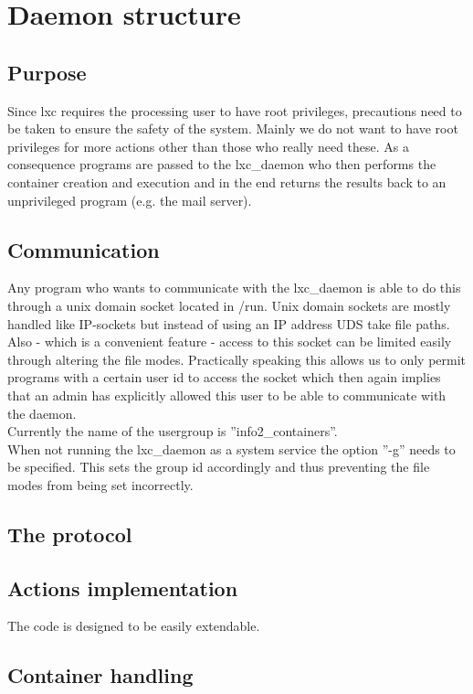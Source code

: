 \chapter{Daemon structure}

\section{Purpose}

Since lxc requires the processing user to have root privileges, precautions need to be taken to ensure
the safety of the system. Mainly we do not want to have root privileges for more actions other than those who really
need these. As a consequence programs are passed to the lxc\_daemon who then performs the container creation
and execution and in the end returns the results back to an unprivileged program (e.g. the mail server).

\section{Communication}

Any program who wants to communicate with the lxc\_daemon is able to do this through a unix domain socket located
in /run. Unix domain sockets are mostly handled like IP-sockets but instead of using an IP address UDS take file paths.
Also - which is a convenient feature - access to this socket can be limited easily through altering the file modes.
Practically speaking this allows us to only permit programs with a certain user id to access the socket which then again
implies that an admin has explicitly allowed this user to be able to communicate with the daemon.\\
Currently the name of the usergroup is ''info2\_containers''.\\
When not running the lxc\_daemon as a system service the option ''-g'' needs to be specified. This sets the group id
accordingly and thus preventing the file modes from being set incorrectly.

\section{The protocol}

\section{Actions implementation}

The code is designed to be easily extendable.

\section{Container handling}